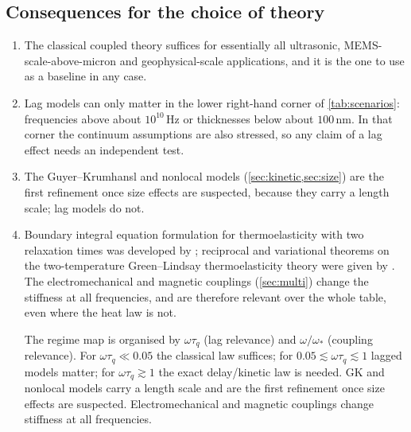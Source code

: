 \subsection{Consequences for the choice of theory}
\begin{enumerate}
\item The classical coupled theory suffices for essentially all ultrasonic, MEMS-scale-above-micron and geophysical-scale applications, and it is the one to use as a baseline in any case.
\item Lag models can only matter in the lower right-hand corner of \cref{tab:scenarios}: frequencies above about $10^{10}$\,Hz or thicknesses below about $100$\,nm. In that corner the continuum assumptions are also stressed, so any claim of a lag effect needs an independent test.
\item The Guyer--Krumhansl and nonlocal models (\cref{sec:kinetic,sec:size}) are the first refinement once size effects are suspected, because they carry a length scale; lag models do not.
\item Boundary integral equation formulation for thermoelasticity with two relaxation times was developed by \citep{Anwar1994}; reciprocal and variational theorems on the two-temperature Green--Lindsay thermoelasticity theory were given by \citep{Sachan2022}. The electromechanical and magnetic couplings (\cref{sec:multi}) change the stiffness at all frequencies, and are therefore relevant over the whole table, even where the heat law is not.

\begin{summarybox}[Summary]
The regime map is organised by $\omega\tau_q$ (lag relevance) and $\omega/\omega_*$ (coupling relevance). For $\omega\tau_q\ll0.05$ the classical law suffices; for $0.05\lesssim\omega\tau_q\lesssim1$ lagged models matter; for $\omega\tau_q\gtrsim1$ the exact delay/kinetic law is needed. GK and nonlocal models carry a length scale and are the first refinement once size effects are suspected. Electromechanical and magnetic couplings change stiffness at all frequencies.
\end{summarybox}
\end{enumerate}
